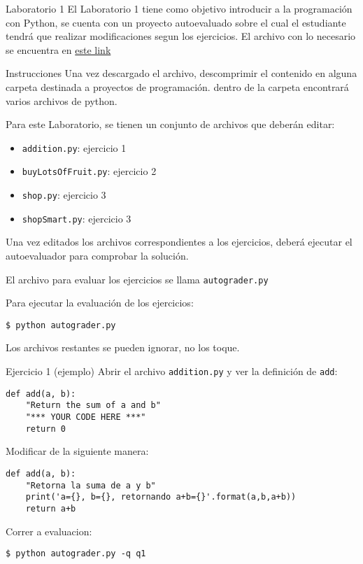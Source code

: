 \documentclass[10pt]{beamer}
\begin{document}
\begin{frame}[fragile]{Laboratorio 1}
El Laboratorio 1 tiene como objetivo introducir a la programación con Python, 
se cuenta con un proyecto autoevaluado sobre el cual el estudiante tendrá que realizar
modificaciones segun los ejercicios.
El archivo con lo necesario se encuentra en \href{https://inst.eecs.berkeley.edu/~cs188/fa18/assets/files/tutorial.zip}{este link}
\end{frame}

\begin{frame}{Instrucciones}
Una vez descargado el archivo, descomprimir el contenido en alguna carpeta destinada a 
proyectos de programación. dentro de la carpeta encontrará varios archivos de python.

Para este Laboratorio, se tienen un conjunto de archivos que deberán editar:
\begin{itemize}
    \item \texttt{addition.py}: ejercicio 1
    \item \texttt{buyLotsOfFruit.py}: ejercicio 2
    \item \texttt{shop.py}: ejercicio 3
    \item \texttt{shopSmart.py}: ejercicio 3
\end{itemize}
Una vez editados los archivos correspondientes a los ejercicios, deberá ejecutar el autoevaluador 
para comprobar la solución.

El archivo para evaluar los ejercicios se llama \texttt{autograder.py}

Para ejecutar la evaluación de los ejercicios:
\begin{lstlisting}
$ python autograder.py
\end{lstlisting}
Los archivos restantes se pueden ignorar, no los toque.

\end{frame}

\begin{frame}{Ejercicio 1 (ejemplo)}
Abrir el archivo \texttt{addition.py} y ver la definición de \texttt{add}:
\begin{lstlisting}
def add(a, b):
    "Return the sum of a and b"
    "*** YOUR CODE HERE ***"
    return 0
\end{lstlisting}
Modificar de la siguiente manera:
\begin{lstlisting}
def add(a, b):
    "Retorna la suma de a y b"
    print('a={}, b={}, retornando a+b={}'.format(a,b,a+b))
    return a+b
\end{lstlisting}
Correr a evaluacion:
\begin{lstlisting}
$ python autograder.py -q q1
\end{lstlisting}
\end{frame}
\end{document}
